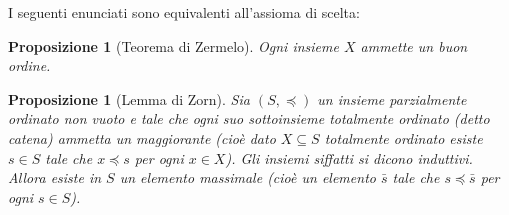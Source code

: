 \documentclass[a4paper,10pt,oneside]{article}
\newcommand{\myname}[1]{\emph{#1}}
\theoremstyle{plain}
\newtheorem{myprop}[mytheorem]{Proposizione}
\theoremstyle{definition}
\theoremstyle{remark}
\begin{document}
I seguenti enunciati sono equivalenti all'assioma di scelta:

\begin{myprop}[Teorema di Zermelo]
 Ogni insieme $X$ ammette un buon ordine. 
\end{myprop}
\begin{myprop}[Lemma di Zorn]
 Sia $(S,\preceq)$ un insieme parzialmente ordinato non vuoto e tale che ogni suo sottoinsieme totalmente ordinato (detto \myname{catena}) ammetta un maggiorante
 (cioè dato $X \subseteq S$ totalmente ordinato esiste $s\in S$ tale che $x\preceq s$ per ogni $x\in X$). Gli insiemi siffatti si dicono \myname{induttivi}. Allora esiste in $S$ un elemento massimale
 (cioè un elemento $\bar s$ tale che $s \preceq \bar s$ per ogni $s\in S$).
\end{myprop}
\end{document}
